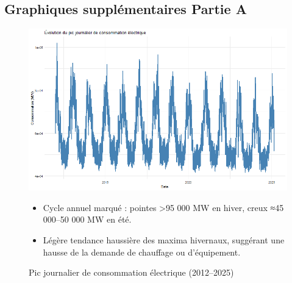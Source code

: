 \documentclass[12pt,a4paper]{article}
\begin{document}
\subsection{Graphiques supplémentaires Partie A}

\begin{figure}[H]
  \centering
  \begin{minipage}[t]{0.48\textwidth}
    \centering
    \includegraphics[width=\linewidth]{Projet_partie_A/graphique_conso.png}
    \caption{Pic journalier de consommation électrique (2012–2025)}
    \label{fig:conso_journaliere}
  \end{minipage}
  \hfill
  \begin{minipage}[t]{0.48\textwidth}
    \begin{itemize}
      \item Cycle annuel marqué : pointes >95 000 MW en hiver, creux ≈45 000–50 000 MW en été.  
      \item Légère tendance haussière des maxima hivernaux, suggérant une hausse de la demande de chauffage ou d’équipement.  
    \end{itemize}
  \end{minipage}
\end{figure}
\end{document}
